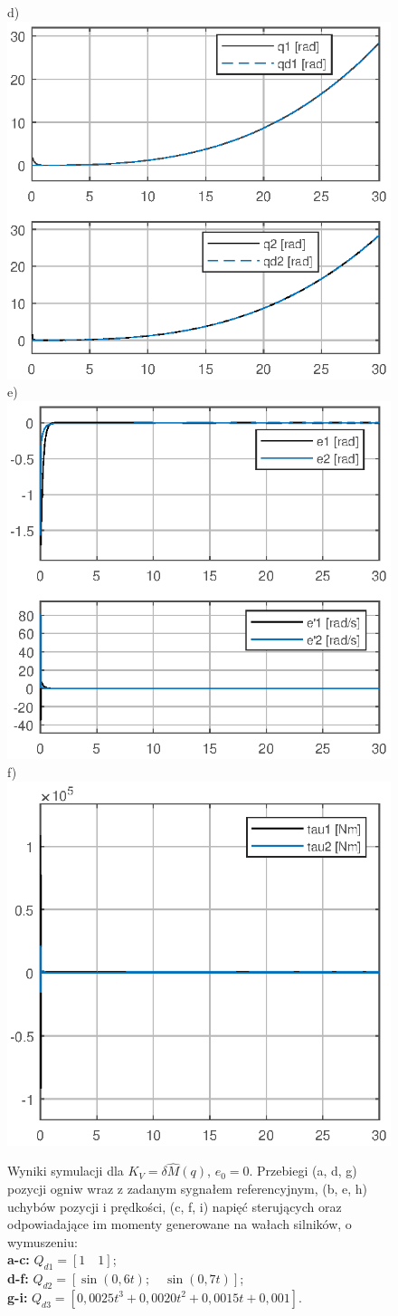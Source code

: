 \documentclass[12pt, a4paper, polish]{article}
\begin{document}
\begin{figure}[H]
	d) \includegraphics[width=0.30\columnwidth]{SRManCw5/SRManCw5_ZADANIE2/figs/06Pozycje} e)\includegraphics[width=0.30\columnwidth]{SRManCw5/SRManCw5_ZADANIE2/figs/06Uchyby} f)\includegraphics[width=0.30\columnwidth]{SRManCw5/SRManCw5_ZADANIE2/figs/06Sygnal}\caption{
		Wyniki symulacji dla $K_V=\delta\hat{M}(q)$, $e_0=0$. Przebiegi (a, d, g) pozycji ogniw wraz z zadanym sygnałem referencyjnym, (b, e, h) uchybów pozycji i prędkości, (c, f, i)  napięć sterujących oraz odpowiadające im momenty generowane na wałach silników, o wymuszeniu:\\
		\textbf{a-c:} $Q_{d1}=[1\quad1]$;\\
		\textbf{d-f:} $Q_{d2}=[\sin(0,6t);\quad \sin(0,7t)]$;\\
		\textbf{g-i:} $Q_{d3}=[0,0025t^3+0,0020t^2+0,0015t+0,001]$.}
\end{figure}
\end{document}
